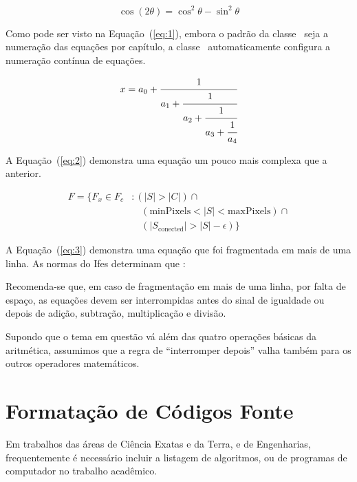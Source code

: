 \documentclass[times,english,brazil,oneside,section=TITLE]{ifes8}
\begin{document}
\begin{equation}
  \label{eq:1}
  \cos (2\theta) = \cos^2 \theta - \sin^2 \theta
\end{equation}

Como pode ser visto na Equação~(\ref{eq:1}), embora o padrão da classe
\abnTeX\ seja a numeração das equações por capítulo, a classe
\ifestex\ automaticamente configura a numeração contínua de equações.

\begin{equation}
  \label{eq:2}
  x = a_0 + \cfrac{1}{a_1 
    + \cfrac{1}{a_2 
      + \cfrac{1}{a_3 + \cfrac{1}{a_4}}}}
\end{equation}

A Equação~(\ref{eq:2}) demonstra uma equação um pouco mais complexa
que a anterior.

\begin{equation}
  \label{eq:3}
  \begin{split}
    F = \{F_{x} \in  F_{c} &: (|S| > |C|) \cap {}\\
    &\quad (\text{minPixels}  < |S| < \text{maxPixels}) \cap {} \\
    &\quad (|S_{\text{conected}}| > |S| - \epsilon) \}
  \end{split}
\end{equation}

A Equação~(\ref{eq:3}) demonstra uma equação que foi fragmentada em
mais de uma linha. As normas do Ifes determinam que
\cite[p.~38]{Ifes2017}:

\begin{citacao}
  Recomenda-se que, em caso de fragmentação em mais de uma linha, por
  falta de espaço, as equações devem ser interrompidas antes do sinal
  de igualdade ou depois de adição, subtração, multiplicação e
  divisão.
\end{citacao}

Supondo que o tema em questão vá além das quatro operações básicas da
aritmética, assumimos que a regra de ``interromper depois'' valha
também para os outros operadores matemáticos.


\section{Formatação de Códigos Fonte}

Em trabalhos das áreas de Ciência Exatas e da Terra, e de Engenharias,
frequentemente é necessário incluir a listagem de algoritmos, ou de programas de
computador no trabalho acadêmico.
\end{document}
